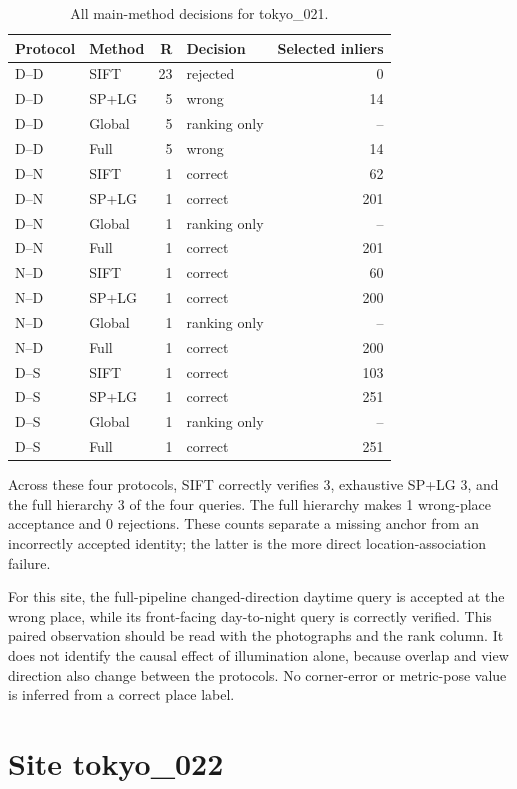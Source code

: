 \begin{table}[H]\centering\small
\caption{All main-method decisions for tokyo\_021.}\label{tab:tokyo-site-21}
\begin{tabular}{llrlr}\toprule
Protocol & Method & R & Decision & Selected inliers \\
\midrule
D--D & SIFT & 23 & rejected & 0 \\
D--D & SP+LG & 5 & wrong & 14 \\
D--D & Global & 5 & ranking only & -- \\
D--D & Full & 5 & wrong & 14 \\
D--N & SIFT & 1 & correct & 62 \\
D--N & SP+LG & 1 & correct & 201 \\
D--N & Global & 1 & ranking only & -- \\
D--N & Full & 1 & correct & 201 \\
N--D & SIFT & 1 & correct & 60 \\
N--D & SP+LG & 1 & correct & 200 \\
N--D & Global & 1 & ranking only & -- \\
N--D & Full & 1 & correct & 200 \\
D--S & SIFT & 1 & correct & 103 \\
D--S & SP+LG & 1 & correct & 251 \\
D--S & Global & 1 & ranking only & -- \\
D--S & Full & 1 & correct & 251 \\
\bottomrule\end{tabular}\end{table}


Across these four protocols, SIFT correctly verifies 3, exhaustive SP+LG 3, and the full hierarchy 3 of the four queries. The full hierarchy makes 1 wrong-place acceptance and 0 rejections. These counts separate a missing anchor from an incorrectly accepted identity; the latter is the more direct location-association failure.

For this site, the full-pipeline changed-direction daytime query is accepted at the wrong place, while its front-facing day-to-night query is correctly verified. This paired observation should be read with the photographs and the rank column. It does not identify the causal effect of illumination alone, because overlap and view direction also change between the protocols. No corner-error or metric-pose value is inferred from a correct place label.

\section{Site tokyo\_022}

